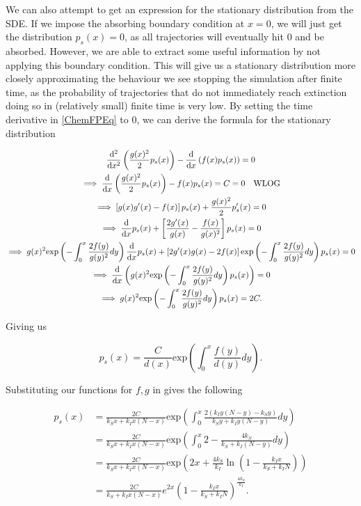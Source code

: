 \documentclass[12pt,a4paper,openany,twoside]{book}
\renewcommand{\d}{{\mathrm d}}
\newcommand{\fd}[2]{\mathchoice{\frac{\d #1}{\d #2}}{\d #1/\d #2}{\d #1/\d #2}{\d #1/\d #2}}
\newcommand{\fdd}[2]{\mathchoice{\frac{\d^2 #1}{\d #2^2}}{\d^2 #1/\d #2^2}{\d^2 #1/\d #2^2}{\d^2 #1/\d #2^2}}
\begin{document}
We can also attempt to get an expression for the stationary distribution from the SDE. If we impose the absorbing boundary condition at $x=0$, we will just get the distribution $p_s(x) = 0$, as all trajectories will eventually hit $0$ and be absorbed. However, we are able to extract some useful information by not applying this boundary condition. This will give us a stationary distribution more closely approximating the behaviour we see stopping the simulation after finite time, as the probability of trajectories that do not immediately reach extinction doing so in (relatively small) finite time is very low. By setting the time derivative in \ref{ChemFPEq} to $0$, we can derive the formula for the stationary distribution

\begin{multline}
	\fdd{}{x} \left( \frac {g(x)^2} {2} p_s(x) \right) - \fd{}{x} \left( f(x) p_s(x) \right) = 0 \\
	\implies \fd{}{x} \left( \frac {g(x)^2} {2} p_s(x) \right) - f(x) p_s(x) = C = 0 \quad \text{WLOG} \\
	\implies \left[ g(x) g'(x) - f(x) \right] p_s(x) + \frac {g(x)^2} {2} p_s'(x) = 0 \\
	\implies \fd{}{x} p_s(x) + \left[ \frac {2 g'(x)} {g(x)} - \frac {f(x)} {g(x)^2} \right] p_s(x) = 0 \\
	\implies g(x)^2 \mathrm{exp} \left(- \int_0^x \frac {2 f(y)} {g(y)^2} dy \right) \fd{}{x} p_s(x) + \left[ 2 g'(x)g(x) - 2 f(x) \right] \mathrm{exp} \left(- \int_0^x \frac {2 f(y)} {g(y)^2} dy \right) p_s(x) = 0 \\
	\implies \fd{}{x} \left( g(x)^2 \mathrm{exp} \left(- \int_0^x \frac {2 f(y)} {g(y)^2} dy \right) p_s(x) \right) = 0 \\
	\implies g(x)^2 \mathrm{exp} \left( - \int_0^x \frac{2 f(y)} {g(y)^2} dy \right) p_s(x) = 2C.
\end{multline}

Giving us

\begin{equation}
	p_s(x) = \frac C {d(x)} \mathrm{exp} \left( \int_0^x \frac {f(y)} {d(y)} dy \right).
\end{equation}

Substituting our functions for $f, g$ in gives the following

\begin{equation}
\begin{aligned}
	p_s(x) &= \frac {2C} {k_S x + k_I x (N-x)} \mathrm{exp} \left( \int_0^x \frac {2 (k_I y (N-y) - k_S y)} {k_S y + k_I y (N-y)}dy \right) \\
	&= \frac {2C} {k_S x + k_I x (N-x)} \mathrm{exp} \left( \int_0^x 2 - \frac {4k_S} {k_S + k_I (N-y)} dy \right) \\
	&= \frac {2C} {k_S x + k_I x (N-x)} \mathrm{exp} \left( 2x + \frac {4k_S} {k_I} \ln \left( 1 - \frac {k_I x} {k_S + k_I N} \right) \right) \\
	&= \frac {2C} {k_S + k_I x (N-x)} e^{2x} \left( 1 - \frac {k_I x} {k_S + k_I N} \right)^{\frac {4k_S} {k_I}}.
\end{aligned}
\end{equation}
\end{document}
